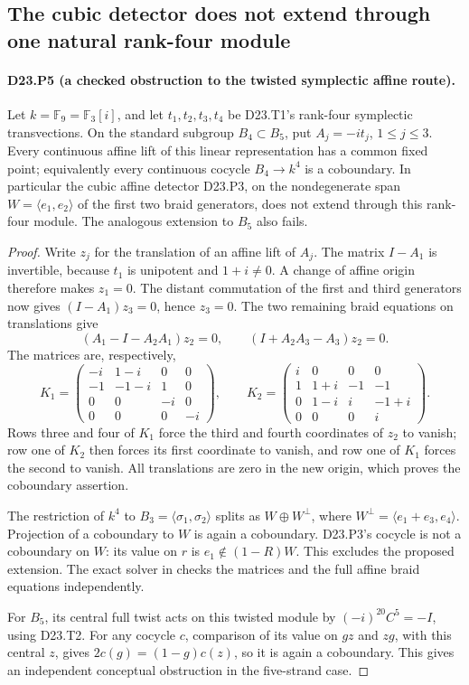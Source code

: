 \subsection{The cubic detector does not extend through one natural rank-four module}
\paragraph{D23.P5 (a checked obstruction to the twisted symplectic affine route).}
Let $k=\mathbb F_9=\mathbb F_3[i]$, and let $t_1,t_2,t_3,t_4$ be
D23.T1's rank-four symplectic transvections. On the standard subgroup
$B_4\subset B_5$, put $A_j=-it_j$, $1\leq j\leq3$. Every
continuous affine lift of this linear representation has a common
fixed point; equivalently every continuous cocycle
$B_4\to k^4$ is a coboundary. In particular the cubic affine detector
D23.P3, on the nondegenerate span $W=\langle e_1,e_2\rangle$ of
the first two braid generators, does not extend through this
rank-four module. The analogous extension to $B_5$ also fails.

\begin{proof}
Write $z_j$ for the translation of an affine lift of $A_j$.
The matrix $I-A_1$ is invertible, because $t_1$ is unipotent and
$1+i\ne0$. A change of affine origin therefore makes $z_1=0$.
The distant commutation of the first and third generators now gives
$(I-A_1)z_3=0$, hence $z_3=0$. The two remaining braid equations
on translations give
\[
 (A_1-I-A_2A_1)z_2=0,\qquad
 (I+A_2A_3-A_3)z_2=0.
\]
The matrices are, respectively,
\[
 K_1=\begin{pmatrix}
 -i&1-i&0&0\\
 -1&-1-i&1&0\\
 0&0&-i&0\\
 0&0&0&-i
 \end{pmatrix},\qquad
 K_2=\begin{pmatrix}
 i&0&0&0\\
 1&1+i&-1&-1\\
 0&1-i&i&-1+i\\
 0&0&0&i
 \end{pmatrix}.
\]
Rows three and four of $K_1$ force the third and fourth coordinates
of $z_2$ to vanish; row one of $K_2$ then forces its first coordinate
to vanish, and row one of $K_1$ forces the second to vanish.
All translations are zero in the new origin, which proves the
coboundary assertion.

The restriction of $k^4$ to $B_3=\langle\sigma_1,\sigma_2\rangle$
splits as $W\oplus W^\perp$, where
$W^\perp=\langle e_1+e_3,e_4\rangle$. Projection of a coboundary
to $W$ is again a coboundary. D23.P3's cocycle is not a coboundary
on $W$: its value on $r$ is $e_1\notin(1-R)W$.
This excludes the proposed extension. The exact solver in
 checks the
matrices and the full affine braid equations independently.

For $B_5$, its central full twist acts on this twisted module by
$(-i)^{20}C^5=-I$, using D23.T2. For any cocycle $c$, comparison
of its value on $gz$ and $zg$, with this central $z$, gives
$2c(g)=(1-g)c(z)$, so it is again a coboundary. This gives an
independent conceptual obstruction in the five-strand case.
\end{proof}

